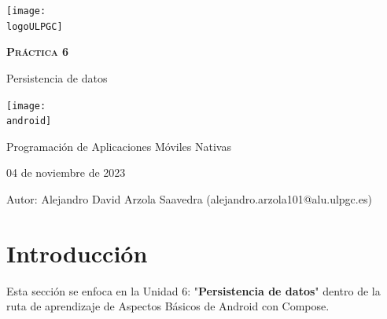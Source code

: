 \documentclass[a4paper]{article}
\newcommand{\dateToday}{04 de noviembre de 2023}
\newcommand{\logoULPGC}{imagenes/ulpgc.png}
\newcommand{\android}{imagenes/android.png}
\begin{document}
    \begin{titlepage}
        \centering
        \vspace*{2cm}
        \texttt{[image: \\logoULPGC]}\par\vspace{1cm}
    
        {\scshape\textbf{\LARGE Práctica 6}}\par
        \vspace{0.6cm}
        {\bfseries}{\Huge Persistencia de datos}
        \vspace{2cm}
    
        \centering
        \texttt{[image: \\android]}
        \vspace{0.5cm}\vspace{0.5cm}
        \begin{tcolorbox}[colback=red!5!white,colframe=white!50!black]
            \centering \Large Programación de Aplicaciones Móviles Nativas \par
            \dateToday
        \end{tcolorbox}

        \vspace{1cm}        
        \begin{tcolorbox}[colback=blue!5!white,colframe=blue!75!black]
            Autor:
            \tcblower
            Alejandro David Arzola Saavedra (alejandro.arzola101@alu.ulpgc.es)
        \end{tcolorbox}
    \end{titlepage}
    
    \newpage
        
    \tableofcontents 
    
    \newpage

    \section{Introducción}

    Esta sección se enfoca en la Unidad 6: "\textbf{Persistencia de datos}" dentro de la ruta de aprendizaje de Aspectos Básicos de Android con Compose. \vspace{0.3cm}
    
\end{document}

